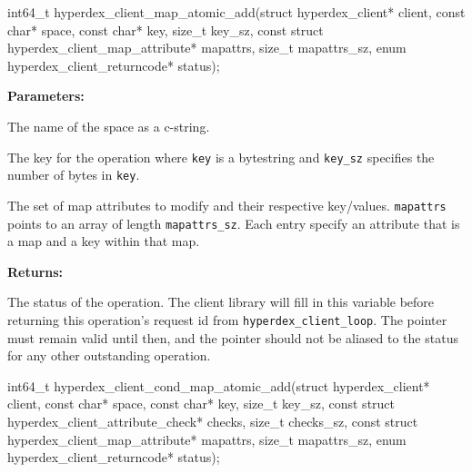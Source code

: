\funcsep
{}
\begin{ccode}
int64_t hyperdex_client_map_atomic_add(struct hyperdex_client* client,
                const char* space,
                const char* key, size_t key_sz,
                const struct hyperdex_client_map_attribute* mapattrs, size_t mapattrs_sz,
                enum hyperdex_client_returncode* status);
\end{ccode}
\funcdesc 

\noindent\textbf{Parameters:}
\begin{description}[labelindent=\widthof{{\texttt{mapattrs}, \texttt{mapattrs\_sz}}},leftmargin=*,noitemsep,nolistsep,align=right]
\item[\texttt{space}] The name of the space as a c-string.
\item[\texttt{key}, \texttt{key\_sz}] The key for the operation where \texttt{key} is a bytestring and \texttt{key\_sz} specifies the number of bytes in \texttt{key}.
\item[\texttt{mapattrs}, \texttt{mapattrs\_sz}] The set of map attributes to modify and their respective key/values.  \texttt{mapattrs} points to an array of length \texttt{mapattrs\_sz}.  Each entry specify an attribute that is a map and a key within that map.
\end{description}

\noindent\textbf{Returns:}
\begin{description}[labelindent=\widthof{{\texttt{status}}},leftmargin=*,noitemsep,nolistsep,align=right]
\item[\texttt{status}] The status of the operation.  The client library will fill in this variable before returning this operation's request id from \texttt{hyperdex\_client\_loop}.  The pointer must remain valid until then, and the pointer should not be aliased to the status for any other outstanding operation.
\end{description}

\funcsep
{}
\begin{ccode}
int64_t hyperdex_client_cond_map_atomic_add(struct hyperdex_client* client,
                const char* space,
                const char* key, size_t key_sz,
                const struct hyperdex_client_attribute_check* checks, size_t checks_sz,
                const struct hyperdex_client_map_attribute* mapattrs, size_t mapattrs_sz,
                enum hyperdex_client_returncode* status);
\end{ccode}
\funcdesc 

